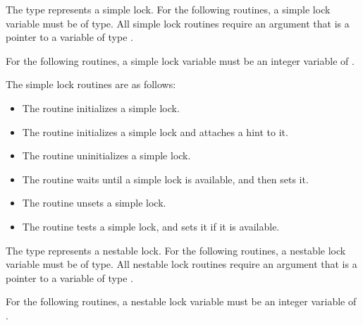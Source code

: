 \begin{ccppspecific}
The type  represents a simple lock. For the 
following routines, a simple lock variable must be of  type. All simple 
lock routines require an argument that is a pointer to a variable of type .
\end{ccppspecific}

\begin{fortranspecific}
For the following routines, a simple lock variable must be an integer variable of 
.
\end{fortranspecific}

The simple lock routines are as follows:

\begin{itemize}
\item The  routine initializes a simple lock.

\item The  routine initializes a simple lock and attaches a hint to it.

\item The  routine uninitializes a simple lock.

\item The  routine waits until a simple lock is available, and then sets it.

\item The  routine unsets a simple lock.

\item The  routine tests a simple lock, and sets it if it is available.
\end{itemize}

\begin{ccppspecific}
The type  represents a nestable lock. 
For the following routines, a nestable lock variable must be of  type. 
All nestable lock routines require an argument that is a pointer to a variable of type 
.
\end{ccppspecific}

\begin{fortranspecific}
For the following routines, a nestable lock variable must be an integer variable of 
.
\end{fortranspecific}

